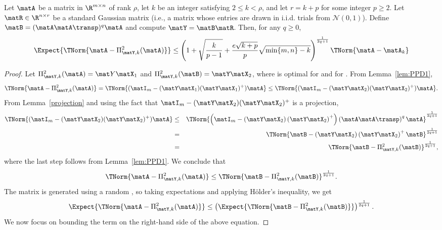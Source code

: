 \begin{lemma}  \label{troppextension0}
Let $\matA$ be a matrix in $\R^{m \times n}$ of rank $\rho$,  let $k$ be an integer satisfying $2 \leq k < \rho$, and let $r = k+p$ for some integer $p \geq 2$.
Let $\matR \in \R^{n \times r}$ be a standard Gaussian matrix (i.e., a matrix whose entries are drawn in i.i.d. trials from $\mathcal{N}(0,1)$).
Define $\matB = (\matA \matA\transp)^q \matA$ and compute $\matY = \matB \matR$. Then, for any $q \geq 0$,
$$\Expect{\TNorm{\matA - \Pi_{\matY,k}^2(\matA) } } \leq
\left(1 + \sqrt{\frac{k}{p-1}} + \frac{e \sqrt{k+p}}{p} \sqrt{ \min\{ m,n\} -k } \right)^{\frac{1}{2q+1}}
\TNorm{\matA - \matA_k}$$
\end{lemma}
\begin{proof}
Let $\Pi_{\matY,k}^2(\matA) =\mat Y\matX_1$ and $\Pi_{\matY,k}^2(\matB)
= \matY\matX_2$, where
 is optimal for \math{\matA} and  for
\math{\matB}.
From Lemma~\ref{lem:PPD1},
$$\TNorm{\matA-\Pi_{\matY,k}^2(\matA)} =
\TNorm{(\matI_m-(\matY\matX_1)(\matY\matX_1)^+)\matA} \leq
\TNorm{(\matI_m-(\matY\matX_2)(\matY\matX_2)^+)\matA}.$$
From Lemma~\ref{projection} and using the fact that $\matI_m-(\matY\matX_2)(\matY\matX_2)^+$ is a projection,
\begin{eqnarray*}
\TNorm{(\matI_m-(\matY\matX_2)(\matY\matX_2)^+)\matA}&\leq&
\TNorm{\left(\matI_m-\left(\matY\matX_2\right)\left(\matY\matX_2\right)^+\right)\left(\matA\matA\transp\right)^q\matA}^{\frac{1}{2q+1}}\\
&=&
\TNorm{\matB-\left(\matY\matX_2\right)\left(\matY\matX_2\right)^+\matB}^{\frac{1}{2q+1}}\\
&=&
\TNorm{\matB-\Pi_{\matY,k}^2(\matB)}^{\frac{1}{2q+1}},
\end{eqnarray*}
where the last step follows from Lemma~\ref{lem:PPD1}.
We conclude that
\begin{equation*}
\TNorm{\matA-\Pi_{\matY,k}^2(\matA)} \leq \TNorm{\matB-\Pi_{\matY,k}^2(\matB)}^{\frac{1}{2q+1}}.
\end{equation*}
The matrix \math{\matY} is generated using a random \math{\matR}, so
taking expectations and applying H\"{o}lder's inequality, we get
\begin{equation}\label{eqn:PPD22}
\Expect{\TNorm{\matA-\Pi_{\matY,k}^2(\matA)}} \leq \left(\Expect{\TNorm{\matB-\Pi_{\matY,k}^2(\matB)}}\right)^{\frac{1}{2q+1}}.
\end{equation}
We now focus on bounding the term on
the right-hand side of the above equation.

\end{proof}
